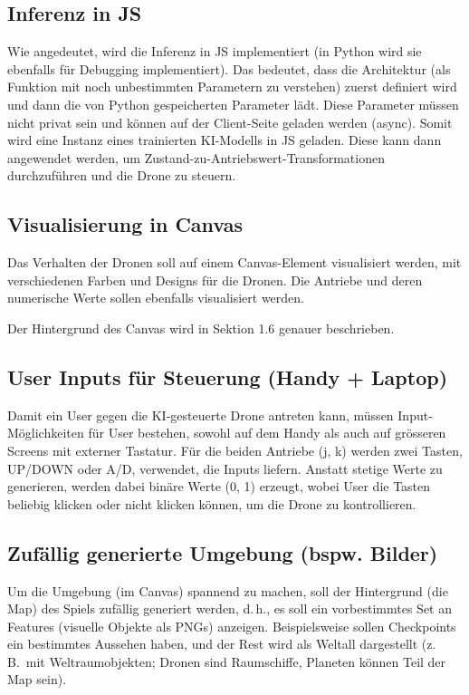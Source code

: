 \documentclass[8pt]{extarticle}
\begin{document}
\subsection{Inferenz in JS}
Wie angedeutet, wird die Inferenz in JS implementiert (in Python wird sie ebenfalls für Debugging implementiert). Das bedeutet, dass die Architektur (als Funktion mit noch unbestimmten Parametern zu verstehen) zuerst definiert wird und dann die von Python gespeicherten Parameter lädt. Diese Parameter müssen nicht privat sein und können auf der Client-Seite geladen werden (async). Somit wird eine Instanz eines trainierten KI-Modells in JS geladen. Diese kann dann angewendet werden, um Zustand-zu-Antriebswert-Transformationen durchzuführen und die Drone zu steuern.

\subsection{Visualisierung in Canvas}
Das Verhalten der Dronen soll auf einem Canvas-Element visualisiert werden, mit verschiedenen Farben und Designs für die Dronen. Die Antriebe und deren numerische Werte sollen ebenfalls visualisiert werden.

\noindent
Der Hintergrund des Canvas wird in Sektion 1.6 genauer beschrieben.  

\subsection{User Inputs für Steuerung (Handy + Laptop)}
Damit ein User gegen die KI-gesteuerte Drone antreten kann, müssen Input-Möglichkeiten für User bestehen, sowohl auf dem Handy als auch auf grösseren Screens mit externer Tastatur. Für die beiden Antriebe (j, k) werden zwei Tasten, UP/DOWN oder A/D, verwendet, die Inputs liefern. Anstatt stetige Werte zu generieren, werden dabei binäre Werte (0, 1) erzeugt, wobei User die Tasten beliebig klicken oder nicht klicken können, um die Drone zu kontrollieren.  

\subsection{Zufällig generierte Umgebung (bspw. Bilder)}
Um die Umgebung (im Canvas) spannend zu machen, soll der Hintergrund (die Map) des Spiels zufällig generiert werden, d.\,h., es soll ein vorbestimmtes Set an Features (visuelle Objekte als PNGs) anzeigen. Beispielsweise sollen Checkpoints ein bestimmtes Aussehen haben, und der Rest wird als Weltall dargestellt (z.\,B.\ mit Weltraumobjekten; Dronen sind Raumschiffe, Planeten können Teil der Map sein).  
\end{document}
